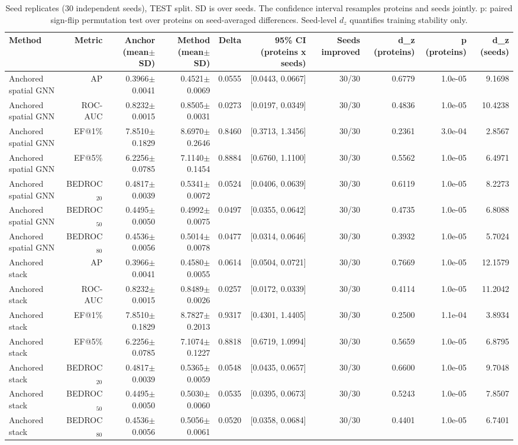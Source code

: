 \begin{table}[t]
\centering
\small
\caption{Seed replicates (30 independent seeds), TEST split. SD is over seeds. The confidence interval resamples proteins and seeds jointly. p: paired sign-flip permutation test over proteins on seed-averaged differences. Seed-level $d_z$ quantifies training stability only.}
\label{tab:table_replicates_test}
\begin{tabular}{lrrrrrrrrr}
\toprule
Method & Metric & Anchor (mean$\pm$SD) & Method (mean$\pm$SD) & Delta & 95\% CI (proteins x seeds) & Seeds improved & d\_z (proteins) & p (proteins) & d\_z (seeds) \\
\midrule
Anchored spatial GNN & AP & 0.3966$\pm$0.0041 & 0.4521$\pm$0.0069 & 0.0555 & [0.0443, 0.0667] & 30/30 & 0.6779 & 1.0e-05 & 9.1698 \\
Anchored spatial GNN & ROC-AUC & 0.8232$\pm$0.0015 & 0.8505$\pm$0.0031 & 0.0273 & [0.0197, 0.0349] & 30/30 & 0.4836 & 1.0e-05 & 10.4238 \\
Anchored spatial GNN & EF@1\% & 7.8510$\pm$0.1829 & 8.6970$\pm$0.2646 & 0.8460 & [0.3713, 1.3456] & 30/30 & 0.2361 & 3.0e-04 & 2.8567 \\
Anchored spatial GNN & EF@5\% & 6.2256$\pm$0.0785 & 7.1140$\pm$0.1454 & 0.8884 & [0.6760, 1.1100] & 30/30 & 0.5562 & 1.0e-05 & 6.4971 \\
Anchored spatial GNN & BEDROC$_{20}$ & 0.4817$\pm$0.0039 & 0.5341$\pm$0.0072 & 0.0524 & [0.0406, 0.0639] & 30/30 & 0.6119 & 1.0e-05 & 8.2273 \\
Anchored spatial GNN & BEDROC$_{50}$ & 0.4495$\pm$0.0050 & 0.4992$\pm$0.0075 & 0.0497 & [0.0355, 0.0642] & 30/30 & 0.4735 & 1.0e-05 & 6.8088 \\
Anchored spatial GNN & BEDROC$_{80}$ & 0.4536$\pm$0.0056 & 0.5014$\pm$0.0078 & 0.0477 & [0.0314, 0.0646] & 30/30 & 0.3932 & 1.0e-05 & 5.7024 \\
Anchored stack & AP & 0.3966$\pm$0.0041 & 0.4580$\pm$0.0055 & 0.0614 & [0.0504, 0.0721] & 30/30 & 0.7669 & 1.0e-05 & 12.1579 \\
Anchored stack & ROC-AUC & 0.8232$\pm$0.0015 & 0.8489$\pm$0.0026 & 0.0257 & [0.0172, 0.0339] & 30/30 & 0.4114 & 1.0e-05 & 11.2042 \\
Anchored stack & EF@1\% & 7.8510$\pm$0.1829 & 8.7827$\pm$0.2013 & 0.9317 & [0.4301, 1.4405] & 30/30 & 0.2500 & 1.1e-04 & 3.8934 \\
Anchored stack & EF@5\% & 6.2256$\pm$0.0785 & 7.1074$\pm$0.1227 & 0.8818 & [0.6719, 1.0994] & 30/30 & 0.5659 & 1.0e-05 & 6.8795 \\
Anchored stack & BEDROC$_{20}$ & 0.4817$\pm$0.0039 & 0.5365$\pm$0.0059 & 0.0548 & [0.0435, 0.0657] & 30/30 & 0.6600 & 1.0e-05 & 9.7048 \\
Anchored stack & BEDROC$_{50}$ & 0.4495$\pm$0.0050 & 0.5030$\pm$0.0060 & 0.0535 & [0.0395, 0.0673] & 30/30 & 0.5243 & 1.0e-05 & 7.8507 \\
Anchored stack & BEDROC$_{80}$ & 0.4536$\pm$0.0056 & 0.5056$\pm$0.0061 & 0.0520 & [0.0358, 0.0684] & 30/30 & 0.4401 & 1.0e-05 & 6.7401 \\
\bottomrule
\end{tabular}
\end{table}
